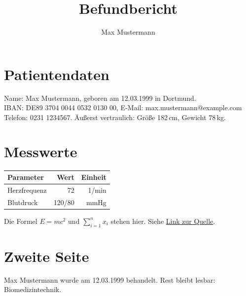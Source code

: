 \documentclass[a4paper,11pt]{article}
\begin{document}
\title{Befundbericht}\author{Max Mustermann}\maketitle
\section{Patientendaten}
Name: Max Mustermann, geboren am 12.03.1999 in Dortmund. \\
IBAN: DE89 3704 0044 0532 0130 00, E-Mail: max.mustermann@example.com \\
Telefon: 0231 1234567. Äußerst vertraulich: Größe 182\,cm, Gewicht 78\,kg.
\section{Messwerte}
\begin{tabular}{|l|r|r|}\hline Parameter & Wert & Einheit\\\hline Herzfrequenz & 72 & 1/min\\ Blutdruck & 120/80 & mmHg\\\hline\end{tabular}

Die Formel $E=mc^2$ und $\sum_{i=1}^{n} x_i$ stehen hier. Siehe \href{https://example.com}{Link zur Quelle}.
\newpage
\section{Zweite Seite}
Max Mustermann wurde am 12.03.1999 behandelt. Rest bleibt lesbar: Biomedizintechnik.
\end{document}
